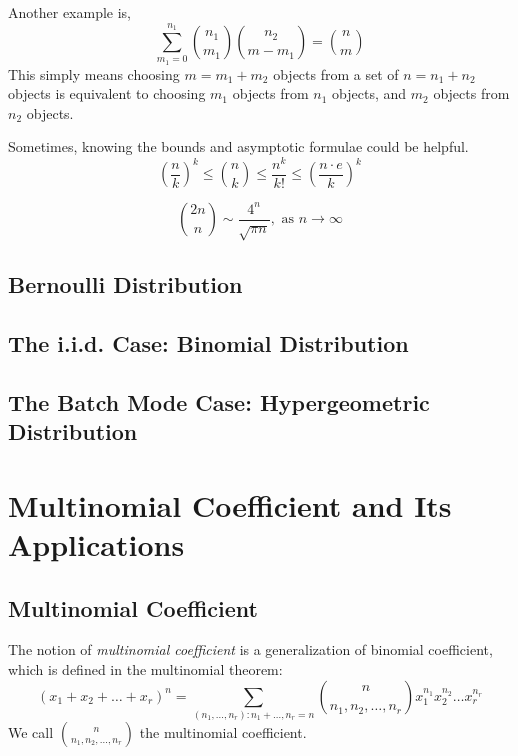 Another example is,
\begin{equation}
	\sum^{n_1}_{m_1=0} {n_1 \choose m_1} {n_2 \choose m-m_1} = {n \choose m}
\end{equation}
This simply means choosing $m=m_1+m_2$ objects from a set of $n=n_1+n_2$ objects is equivalent to choosing $m_1$ objects from $n_1$ objects, and $m_2$ objects from $n_2$ objects.

Sometimes, knowing the bounds and asymptotic formulae could be helpful.
\begin{equation}
	\left(\frac{n}{k}\right)^k \le {n \choose k} \le {\frac{n^k}{k!}} \le \left(\frac{n \cdot e}{k}\right)^k
\end{equation}

\begin{equation}
	{2n \choose n} \sim \frac{4^n}{\sqrt{\pi n}}, \mbox{ as } n \rightarrow \infty
\end{equation}

\subsection{Bernoulli Distribution}
\subsection{The i.i.d. Case: Binomial Distribution}
\subsection{The Batch Mode Case: Hypergeometric Distribution}



\section{Multinomial Coefficient and Its Applications}

\subsection{Multinomial Coefficient}
The notion of {\em{multinomial coefficient}} is a generalization of binomial coefficient, which is defined in the multinomial theorem:
\begin{equation*}
	(x_1+x_2+\ldots+x_r)^n = \sum_{(n_1,\ldots,n_r):n_1+\ldots,n_r=n} {n \choose n_1,n_2,\ldots,n_r}x_1^{n_1}x_2^{n_2} \ldots x_r^{n_r}
\end{equation*}
We call $n \choose n_1,n_2,\ldots,n_r$ the multinomial coefficient.

